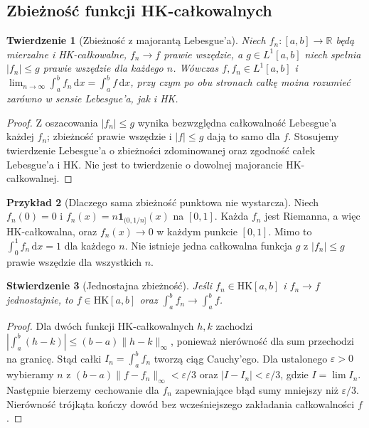 \documentclass[11pt,a4paper]{article}
\numberwithin{equation}{section}
\theoremstyle{plain}
\newtheorem{twierdzenie}{Twierdzenie}[section]
\newtheorem{stwierdzenie}[twierdzenie]{Stwierdzenie}
\theoremstyle{definition}
\newtheorem{przyklad}[twierdzenie]{Przykład}
\theoremstyle{remark}
\newcommand{\R}{\mathbb R}
\newcommand{\ind}[1]{\mathbf 1_{#1}}
\newcommand{\HK}{\mathrm{HK}}
\begin{document}
\subsection*{Zbieżność funkcji HK-całkowalnych}
\begin{twierdzenie}[Zbieżność z majorantą Lebesgue'a]\label{tw:hk-zbieznosc-dct}
Niech $f_n:[a,b]\to\R$ będą mierzalne i HK-całkowalne, $f_n\to f$ prawie wszędzie, a $g\in L^1[a,b]$ niech spełnia $|f_n|\le g$ prawie wszędzie dla każdego $n$. Wówczas $f,f_n\in L^1[a,b]$ i
$\lim_{n\to\infty}\int_a^bf_n\,\mathrm dx=\int_a^bf\,\mathrm dx$, przy czym po obu stronach całkę można rozumieć zarówno w sensie Lebesgue'a, jak i HK.
\end{twierdzenie}
\begin{proof}
Z oszacowania $|f_n|\le g$ wynika bezwzględna całkowalność Lebesgue'a każdej $f_n$; zbieżność prawie wszędzie i $|f|\le g$ dają to samo dla $f$. Stosujemy twierdzenie Lebesgue'a o zbieżności zdominowanej oraz zgodność całek Lebesgue'a i HK. Nie jest to twierdzenie o dowolnej majorancie HK-całkowalnej.
\end{proof}
\begin{przyklad}[Dlaczego sama zbieżność punktowa nie wystarcza]
Niech $f_n(0)=0$ i $f_n(x)=n\ind{(0,1/n]}(x)$ na $[0,1]$. Każda $f_n$ jest Riemanna, a więc HK-całkowalna, oraz $f_n(x)\to0$ w każdym punkcie $[0,1]$. Mimo to $\int_0^1f_n\,\mathrm dx=1$ dla każdego $n$. Nie istnieje jedna całkowalna funkcja $g$ z $|f_n|\le g$ prawie wszędzie dla wszystkich $n$.
\end{przyklad}
\begin{stwierdzenie}[Jednostajna zbieżność]\label{st:hk-zbieznosc-jednostajna}
Jeśli $f_n\in\HK[a,b]$ i $f_n\to f$ jednostajnie, to $f\in\HK[a,b]$ oraz $\int_a^bf_n\to\int_a^bf$.
\end{stwierdzenie}
\begin{proof}
Dla dwóch funkcji HK-całkowalnych $h,k$ zachodzi $|\int_a^b(h-k)|\le(b-a)\|h-k\|_\infty$, ponieważ nierówność dla sum przechodzi na granicę. Stąd całki $I_n=\int_a^bf_n$ tworzą ciąg Cauchy'ego. Dla ustalonego $\varepsilon>0$ wybieramy $n$ z $(b-a)\|f-f_n\|_\infty<\varepsilon/3$ oraz $|I-I_n|<\varepsilon/3$, gdzie $I=\lim I_n$. Następnie bierzemy cechowanie dla $f_n$ zapewniające błąd sumy mniejszy niż $\varepsilon/3$. Nierówność trójkąta kończy dowód bez wcześniejszego zakładania całkowalności $f$.
\end{proof}
\end{document}
